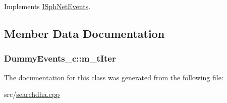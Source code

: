 Implements \hyperlink{classISphNetEvents_a8a3ef57af246784edc2eee321a32b7a0}{I\-Sph\-Net\-Events}.



\subsection{Member Data Documentation}
\hypertarget{classDummyEvents__c_a61b40bafa0f7dfc72771892a217bc646}{
\subsubsection[{m\-\_\-t\-Iter}]{ Dummy\-Events\-\_\-c\-::m\-\_\-t\-Iter\hspace{0.3cm}{\ttfamily [private]}}}\label{classDummyEvents__c_a61b40bafa0f7dfc72771892a217bc646}


The documentation for this class was generated from the following file\-:\begin{DoxyCompactItemize}
\item 
src/\hyperlink{searchdha_8cpp}{searchdha.\-cpp}\end{DoxyCompactItemize}
